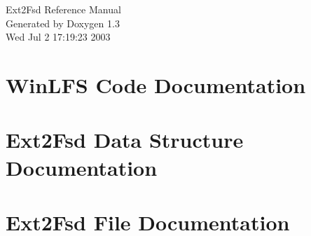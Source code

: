 \documentclass[a4paper]{article}
\begin{document}
\begin{titlepage}
\vspace*{7cm}
\begin{center}
{\Large Ext2Fsd Reference Manual}\\
\vspace*{1cm}
{\large Generated by Doxygen 1.3}\\
\vspace*{0.5cm}
{\small Wed Jul 2 17:19:23 2003}\\
\end{center}
\end{titlepage}
\tableofcontents
{}
\section{Win\-LFS Code Documentation}
\label{index}\hypertarget{index}{}
\section{Ext2Fsd Data Structure Documentation}




\section{Ext2Fsd File Documentation}










\printindex
\end{document}
